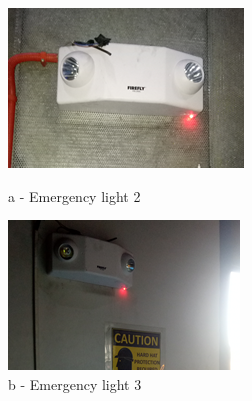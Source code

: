 \begin{figure}[!htb]
	\begin{minipage}[b]{0.22\linewidth}
		\centering
		\includegraphics[width=\textwidth]{figures/ch05_fdas_sd07}
		\caption*{a - Emergency light 2}
	\end{minipage}
	\hspace{0.03cm}
	\begin{minipage}[b]{0.22\linewidth}
		\centering
		\includegraphics[width=\textwidth]{figures/ch05_fdas_sd08}
		\caption*{b - Emergency light 3}
	\end{minipage}
	\hspace{0.03cm}
	\begin{minipage}[b]{0.22\linewidth}
		\centering

\end{minipage}
\end{figure}
